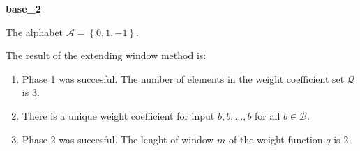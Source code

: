 \begin{exmp}
\textbf{ base\_2 }

\label{ex:base2}

The alphabet $\mathcal{A} =\left\{0, 1, -1\right\}$.

The result of the extending window method is:
\begin{enumerate}
    \item Phase 1 was succesful.
The number of elements in the weight coefficient set $\mathcal{Q}$ is $3$.

    \item There is a unique weight coefficient for input $b,b,\dots,b$ for all $b\in\mathcal{B}$.

    \item Phase 2 was succesful.
The lenght of window $m$ of the weight function $q$ is 2.
\end{enumerate}
\end{exmp}
